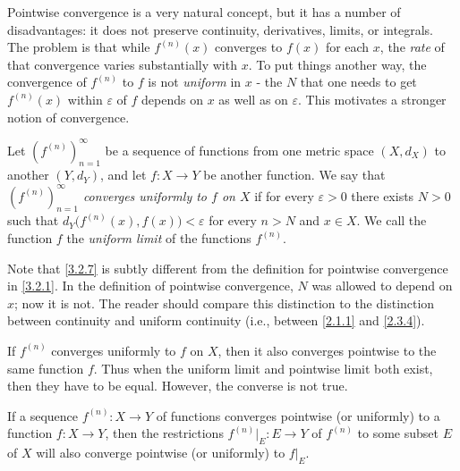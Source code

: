 \begin{note}
  Pointwise convergence is a very natural concept, but it has a number of disadvantages:
  it does not preserve continuity, derivatives, limits, or integrals.
  The problem is that while \(f^{(n)}(x)\) converges to \(f(x)\) for each \(x\), the \emph{rate} of that convergence varies substantially with \(x\).
  To put things another way, the convergence of \(f^{(n)}\) to \(f\) is not \emph{uniform} in \(x\)
  - the \(N\) that one needs to get \(f^{(n)}(x)\) within \(\varepsilon\) of \(f\) depends on \(x\) as well as on \(\varepsilon\).
  This motivates a stronger notion of convergence.
\end{note}

\setcounter{thm}{6}
\begin{defn}\label{3.2.7}
  Let \((f^{(n)})_{n = 1}^\infty\) be a sequence of functions from one metric space \((X, d_X)\) to another \((Y, d_Y)\), and let \(f : X \to Y\) be another function.
  We say that \emph{\((f^{(n)})_{n = 1}^\infty\) converges uniformly to \(f\) on \(X\)} if for every \(\varepsilon > 0\) there exists \(N > 0\) such that \(d_Y\big(f^{(n)}(x), f(x)\big) < \varepsilon\) for every \(n > N\) and \(x \in X\).
  We call the function \(f\) the \emph{uniform limit} of the functions \(f^{(n)}\).
\end{defn}

\begin{rmk}\label{3.2.8}
  Note that \cref{3.2.7} is subtly different from the definition for pointwise convergence in \cref{3.2.1}.
  In the definition of pointwise convergence, \(N\) was allowed to depend on \(x\);
  now it is not.
  The reader should compare this distinction to the distinction between continuity and uniform continuity
  (i.e., between \cref{2.1.1} and \cref{2.3.4}).
\end{rmk}

\begin{note}
  If \(f^{(n)}\) converges uniformly to \(f\) on \(X\), then it also converges pointwise to the same function \(f\).
  Thus when the uniform limit and pointwise limit both exist, then they have to be equal.
  However, the converse is not true.
\end{note}

\begin{note}
  If a sequence \(f^{(n)} : X \to Y\) of functions converges pointwise (or uniformly) to a function \(f : X \to Y\), then the restrictions \(f^{(n)}|_E : E \to Y\) of \(f^{(n)}\) to some subset \(E\) of \(X\) will also converge pointwise (or uniformly) to \(f|_E\).
\end{note}

